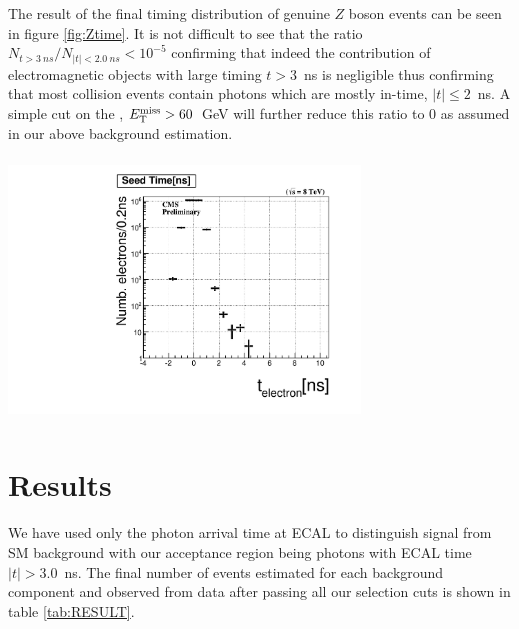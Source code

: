 The result of the final timing distribution of genuine $Z$ boson events  can be seen in figure \ref{fig:Ztime}. It is not difficult to see that the ratio $ N_{t > 3~ns}/ N_{|t| < 2.0~ns}  < 10^{-5}$ confirming that indeed the contribution  of electromagnetic objects with large timing $t >3$~ns is negligible thus confirming that most collision events contain photons which are mostly in-time, $|t| \leq 2$~ns. A simple cut on the \MET, $E_{\mathrm{T}}^{\text{miss}} > 60$~GeV will further reduce this ratio to $0$ as assumed in our above background estimation.
\begin{center}
\centering
\includegraphics[height=7cm, width=0.7\textwidth]{THESISPLOTS/Seed-Time-From-Uncleaned-di-photon-Mass-Fit-DoubleElectron-Run2012A.pdf}
\label{fig:Ztime}
\end{center}
  


\section{Results}
We have used only the photon arrival time at ECAL to distinguish signal from SM background with our acceptance region being photons with ECAL time $|t| > 3.0$~ns. The final number of events estimated for each background component and observed from data after passing all our selection cuts is shown in table \ref{tab:RESULT}.

